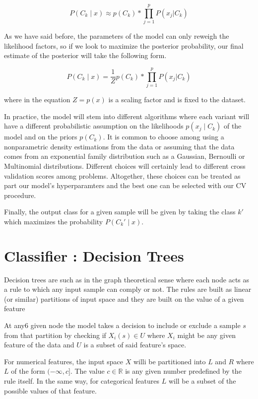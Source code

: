 \[
P(C_k \mid x) \approx p(C_k) * \prod_{j=1}^{p}    P(x_j | C_k)
\]\label{equation-posteriorProbabilityDecomposition2}

As we have said before, the parameters of the model can only reweigh the likelihood factors, so if we look to maximize the posterior probability, our final estimate of the posterior will take the following form.

\[
P(C_k \mid x) = \frac{1}{Z} p(C_k) * \prod_{j=1}^{p}    P(x_j | C_k)
\]\label{equation-posteriorProbabilityDecomposition3}

where in the equation $Z = p(x)$ is a scaling factor and is fixed to the dataset.

In practice, the model will stem into different algorithms where each variant will have a different probabilistic assumption on the likelihoods $p(x_j \mid C_k)$ of the model and on the priors $p(C_k)$. It is common to choose among using a nonparametric density estimations from the data or assuming that the data comes from an exponential family distribution such as a Gaussian, Bernoulli or Multinomial distributions. Different choices will certainly lead to different cross validation scores among problems. Altogether, these choices can be treated as part our model's hyperparamters and the best one can be selected with our CV procedure.


Finally, the output class for a given sample will be given by taking the class $k'$ which maximizes the probability  $P(C_k' \mid x)$.

\section{Classifier : Decision Trees}


Decision trees are such as in the graph theoretical sense where each node acts as a rule to which any input sample can comply or not. The rules are built as linear (or similar) partitions of input space and they are built on the value of a given feature

At any6 given node the model takes a decision to include or exclude a sample $s$ from that partition by checking if $X_i(s) \in U$ where $X_i$ might be any given feature of the data and $U$ is a subset of said feature's space.

For numerical features, the input space $X$ willi be partitioned into  $L$ and $R$ where $L$ of the form $(-\infty,c]$.  The value $c \in \mathbb{R}$ is any given number predefined by the rule itself.   In the same way, for categorical features $L$ will be a subset of the possible values of that feature.

